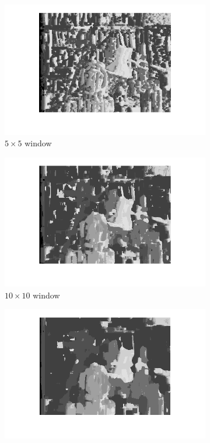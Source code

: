 \documentclass{article}
\begin{document}
\begin{figure}[ht!]
 \begin{subfigure}{.3\textwidth}
  \centering
  \includegraphics[width=\linewidth]{ex3/s5_5.png}
  \caption{$5\times5$ window}
  \label{fig_s1g}
 \end{subfigure}
 \begin{subfigure}{.3\textwidth}
  \centering
  \includegraphics[width=\linewidth]{ex3/s10_10.png}
  \caption{$10\times10$ window}
  \label{fig_s2g}
 \end{subfigure}
 \begin{subfigure}{.3\textwidth}
  \centering
  \includegraphics[width=1\linewidth]{ex3/s15_15.png}

\end{subfigure}
\end{figure}
\end{document}
